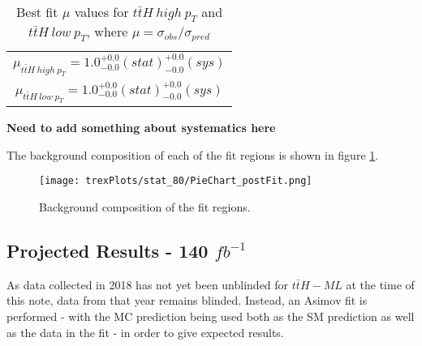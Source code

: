 \begin{table}[H]                                                                                                             
  \centering                                                                                                              
  \begin{tabular}{c}                                                                                            
     $\mu_{t\bar{t}H\ high\ p_T} = 1.0^{+0.0}_{-0.0}(stat)^{+0.0}_{-0.0}(sys)$ \\       
     $\mu_{t\bar{t}H\ low\ p_T} = 1.0^{+0.0}_{-0.0}(stat)^{+0.0}_{-0.0}(sys)$ \\
  \end{tabular}                                                                                                            
  \caption{Best fit $\mu$ values for $t\bar{t}H\ high\ p_T$ and  $t\bar{t}H\ low\ p_T$, where $\mu = \sigma_{obs}/\sigma_{pred}$}
  \label{tab:mu80}                                                                                                  
\end{table}  

\textbf{Need to add something about systematics here}

The background composition of each of the fit regions is shown in figure \ref{fig:pieChart80}.

\begin{figure}[H]
    \centering
    \texttt{[image: trexPlots/stat\_80/PieChart\_postFit.png]}
    \caption{Background composition of the fit regions.}
    \label{fig:pieChart80}
\end{figure} 


\subsection{Projected Results - 140 $fb^{-1}$}   
\label{sec:res140}

As data collected in 2018 has not yet been unblinded for $t\bar{t}H-ML$ at the time of this note, data from that year remains blinded. Instead, an Asimov fit is performed - with the MC prediction being used both as the SM prediction as well as the data in the fit - in order to give expected results.

